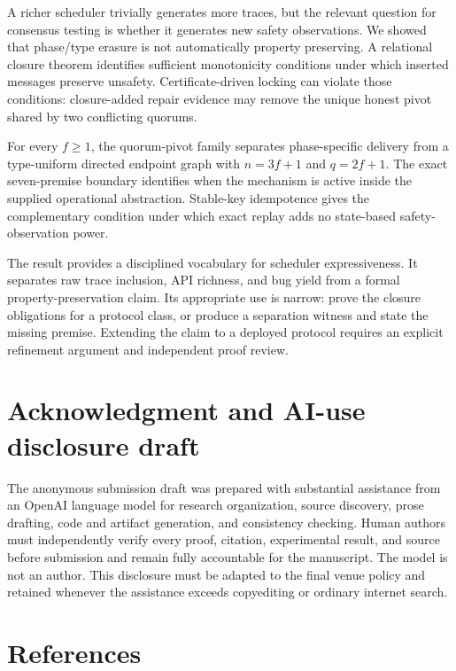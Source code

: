 \documentclass[10pt,a4paper]{article}
\begin{document}
A richer scheduler trivially generates more traces, but the relevant
question for consensus testing is whether it generates new safety
observations. We showed that phase/type erasure is not automatically
property preserving. A relational closure theorem identifies sufficient
monotonicity conditions under which inserted messages preserve unsafety.
Certificate-driven locking can violate those conditions: closure-added
repair evidence may remove the unique honest pivot shared by two
conflicting quorums.

For every \(f\geq1\), the quorum-pivot family separates phase-specific
delivery from a type-uniform directed endpoint graph with \(n=3f+1\) and
\(q=2f+1\). The exact seven-premise boundary identifies when the
mechanism is active inside the supplied operational abstraction.
Stable-key idempotence gives the complementary condition under which
exact replay adds no state-based safety-observation power.

The result provides a disciplined vocabulary for scheduler
expressiveness. It separates raw trace inclusion, API richness, and bug
yield from a formal property-preservation claim. Its appropriate use is
narrow: prove the closure obligations for a protocol class, or produce a
separation witness and state the missing premise. Extending the claim to
a deployed protocol requires an explicit refinement argument and
independent proof review.

\section{Acknowledgment and AI-use disclosure
draft}\label{acknowledgment-and-ai-use-disclosure-draft}

The anonymous submission draft was prepared with substantial assistance
from an OpenAI language model for research organization, source
discovery, prose drafting, code and artifact generation, and consistency
checking. Human authors must independently verify every proof, citation,
experimental result, and source before submission and remain fully
accountable for the manuscript. The model is not an author. This
disclosure must be adapted to the final venue policy and retained
whenever the assistance exceeds copyediting or ordinary internet search.

\section*{References}\label{references}
\end{document}
